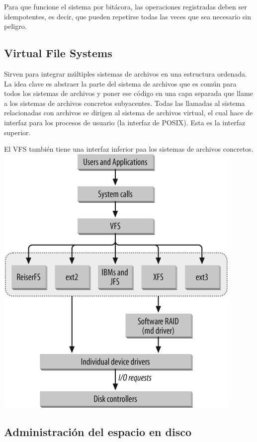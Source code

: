 Para que funcione el sistema por bitácora, las operaciones registradas deben ser idempotentes, es decir, que pueden repetirse todas las veces que sea necesario sin peligro.

\subsection{Virtual File Systems}

Sirven para integrar múltiples sistemas de archivos en una estructura ordenada. La idea clave es abstraer la parte del sistema de archivos que es común para todos los sistemas de archivos y poner ese código en una capa separada que llame a los sistemas de archivos concretos subyacentes. Todas las llamadas al sistema relacionadas con archivos se dirigen al sistema de archivos virtual, el cual hace de interfaz para los procesos de usuario (la interfaz de POSIX). Esta es la interfaz superior.

El VFS también tiene una interfaz inferior paa los sistemas de archivos concretos.
\\


\includegraphics[scale=1]{imagenes/vfs.png}


\subsection{Administración del espacio en disco}

